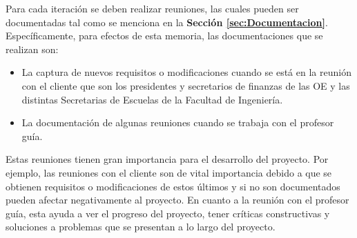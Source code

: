 Para cada iteración se deben realizar reuniones, las cuales pueden ser documentadas tal como se menciona en la \textbf{Sección \ref{sec:Documentacion}}. Específicamente, para efectos de esta memoria, las documentaciones que se realizan son:

\begin{itemize}
    \item La captura de nuevos requisitos o modificaciones cuando se está en la reunión con el cliente que son los presidentes y secretarios de finanzas de las OE y las distintas Secretarias de Escuelas de la Facultad de Ingeniería.
    \item La documentación de algunas reuniones cuando se trabaja con el profesor guía.
\end{itemize} 

Estas reuniones tienen gran importancia para el desarrollo del proyecto. Por ejemplo, las reuniones con el cliente son de vital importancia debido a que se obtienen requisitos o modificaciones de estos últimos y si no son documentados pueden afectar negativamente al proyecto. En cuanto a la reunión con el profesor guía, esta ayuda a ver el progreso del proyecto, tener críticas constructivas y soluciones a problemas que se presentan a lo largo del proyecto.
